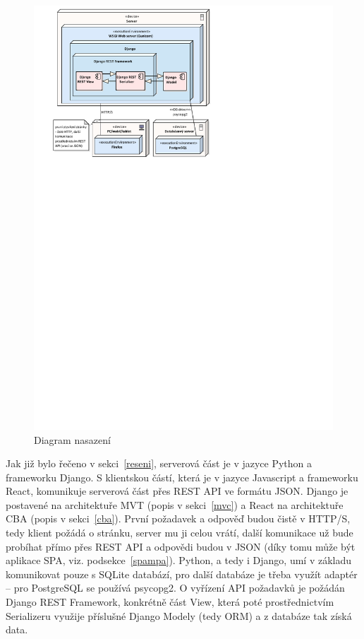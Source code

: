     \begin{figure}[ht]\centering
    	\includegraphics[width=1\textwidth]{img/deployment-diagram}
    	\caption[Diagram nasazení]{Diagram nasazení}\label{fig:deployment-diagram}
    \end{figure}
    
    Jak již bylo řečeno v sekci~\ref{reseni}, serverová část je v jazyce Python a frameworku Django. S klientskou částí, která je v jazyce Javascript a frameworku React, komunikuje serverová část přes REST API ve formátu JSON. Django je postavené na architektuře MVT (popis v sekci~\ref{mvc}) a React na architektuře CBA (popis v sekci~\ref{cba}). První požadavek a odpověď budou čistě v HTTP/S, tedy klient požádá o stránku, server mu ji celou vrátí, další komunikace už bude probíhat přímo přes REST API a odpovědi budou v JSON (díky tomu může být aplikace SPA, viz. podsekce~\ref{spampa}). Python, a tedy i Django, umí v základu komunikovat pouze s SQLite databází, pro další databáze je třeba využít adaptér -- pro PostgreSQL se používá psycopg2. O vyřízení API požadavků je požádán Django REST Framework, konkrétně část View, která poté prostřednictvím Serializeru využije příslušné Django Modely (tedy ORM) a z databáze tak získá data.
    
